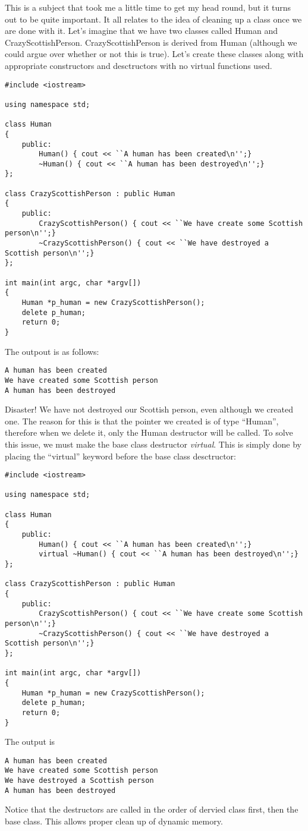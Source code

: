 This is a subject that took me a little time to get my head round, but it turns out to be quite important. It all relates to the idea of cleaning up a class once we are done with it. Let's  imagine that we have two classes called Human and CrazyScottishPerson. CrazyScottishPerson is derived from Human (although we could argue over whether or not this is true).  Let's create these classes along with appropriate constructors and desctructors with no virtual functions used.
\begin{verbatim}
#include <iostream>

using namespace std;

class Human
{
	public:
		Human() { cout << ``A human has been created\n'';}
		~Human() { cout << ``A human has been destroyed\n'';}		
};

class CrazyScottishPerson : public Human
{
	public:
		CrazyScottishPerson() { cout << ``We have create some Scottish person\n'';}
		~CrazyScottishPerson() { cout << ``We have destroyed a Scottish person\n'';}
};

int main(int argc, char *argv[])
{
	Human *p_human = new CrazyScottishPerson();
	delete p_human;
	return 0;
}
\end{verbatim}
The outpout is as follows:
\begin{verbatim}
A human has been created
We have created some Scottish person
A human has been destroyed
\end{verbatim}
Disaster! We have not destroyed our Scottish person, even although we created one. The reason for this is that the pointer we created is of type ``Human'', therefore when we delete it, only the Human destructor will be called. To solve this issue, we must make the base class destructor \emph{virtual}. This is simply done by placing the ``virtual'' keyword before the base class desctructor:
\begin{verbatim}
#include <iostream>

using namespace std;

class Human
{
	public:
		Human() { cout << ``A human has been created\n'';}
		virtual ~Human() { cout << ``A human has been destroyed\n'';}		
};

class CrazyScottishPerson : public Human
{
	public:
		CrazyScottishPerson() { cout << ``We have create some Scottish person\n'';}
		~CrazyScottishPerson() { cout << ``We have destroyed a Scottish person\n'';}
};

int main(int argc, char *argv[])
{
	Human *p_human = new CrazyScottishPerson();
	delete p_human;
	return 0;
}
\end{verbatim}
The output is
\begin{verbatim}
A human has been created
We have created some Scottish person
We have destroyed a Scottish person
A human has been destroyed
\end{verbatim}
Notice that the destructors are called in the order of dervied class first, then the base class. This allows proper clean up of dynamic memory.

